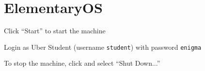 \documentclass[8pt,a4paper,compress]{beamer}
\newlength{\myMheight}
\begin{document}
\section{ElementaryOS}
\begin{frame}[fragile]
\pause\transdissolve

Click ``Start'' to start the machine

\pause\transdissolve\bigskip

Login as Uber Student (username \lstinline{student}) with password \lstinline{enigma}

\pause\transdissolve\bigskip

\begin{center}
\end{center}

\pause\transdissolve\bigskip

To stop the machine, click  and select ``Shut Down...''
\end{frame}
\end{document}
